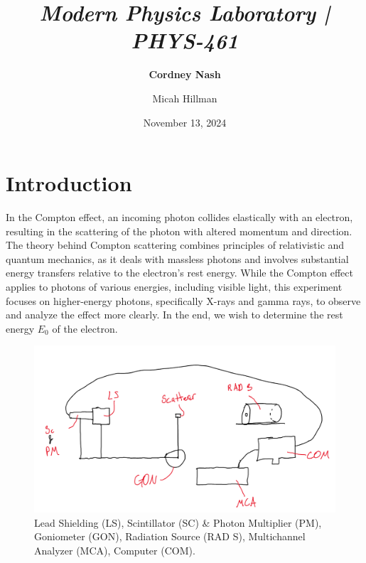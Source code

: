 \documentclass[a4paper,12pt,english]{all-in-one} %
\title{{\large\textit{Modern Physics Laboratory | PHYS-461}}\\[0.5cm]{\Huge\color{gray}\textsc{\@docsubtitle}}}
\author{\textbf{Cordney Nash}  \and Micah Hillman  }
\date{November 13, 2024}
\begin{document}
\begin{titlepage}
\maketitle\vfill
\end{titlepage}
\newpage


\section*{Introduction}
{
In the Compton effect, an incoming photon collides elastically with an electron, resulting in the scattering of the photon with altered momentum and direction. The theory behind Compton scattering combines principles of relativistic and quantum mechanics, as it deals with massless photons and involves substantial energy transfers relative to the electron’s rest energy. While the Compton effect applies to photons of various energies, including visible light, this experiment focuses on higher-energy photons, specifically X-rays and gamma rays, to observe and analyze the effect more clearly. In the end, we wish to determine the rest energy $E_0$ of the electron.
}

\begin{figure}[tbh]
    \centering
    \includegraphics[width=0.8\linewidth]{6-compton/images/Screenshot from 2024-11-16 17-29-02.png}
    \caption{ \scriptsize{ Lead Shielding (LS), Scintillator (SC) \& Photon Multiplier (PM), Goniometer (GON), Radiation Source (RAD S), Multichannel Analyzer (MCA), Computer (COM).
    }}
    \label{fig:xray-diagram}
\end{figure}
\end{document}
